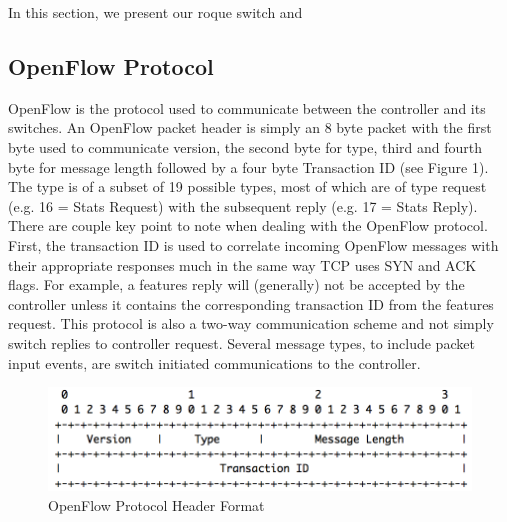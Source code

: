 In this section, we present our roque switch and 

\subsection {OpenFlow Protocol}
OpenFlow is the protocol used to communicate between the controller and its switches. An OpenFlow packet header is simply an 8 byte packet with the first byte used to communicate version, the second byte for type, third and fourth byte for message length followed by a four byte Transaction ID (see Figure 1). The type is of a subset of 19 possible types, most of which are of type request (e.g. 16 = Stats Request) with the subsequent reply (e.g. 17 = Stats Reply). There are couple key point to note when dealing with the OpenFlow protocol. First, the transaction ID is used to correlate incoming OpenFlow messages with their appropriate responses much in the same way TCP uses SYN and ACK flags. For example, a features reply will (generally) not be accepted by the controller unless it contains the corresponding transaction ID from the features request. This protocol is also a two-way communication scheme and not simply switch replies to controller request. Several message types, to include packet input events, are switch initiated communications to the controller.  

\begin{figure}
  \includegraphics[width=\linewidth]{openflowProtocol.png}
  \caption{OpenFlow Protocol Header Format \cite{protocol}}
  \label{fig:protocol}
\end{figure}

